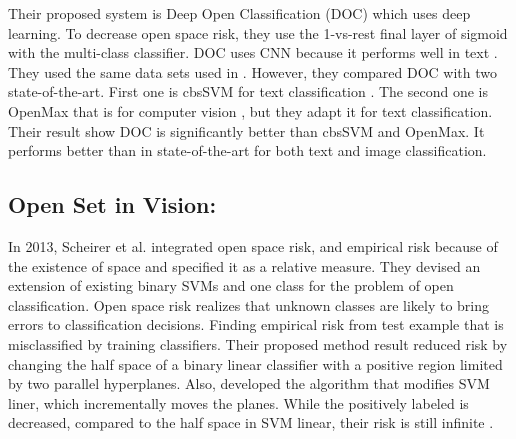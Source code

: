 \documentclass[conference]{IEEEtran}
\begin{document}
\par Their proposed system is Deep Open Classification (DOC) which uses deep learning. To decrease open space risk, they use the 1-vs-rest final layer of sigmoid with the multi-class classifier. DOC uses CNN because it performs well in text \cite{kim2014convolutional}. They used the same data sets used in \cite{fei2016breaking} \cite{rennie200820} \cite{chen2014mining}. However, they compared DOC with two state-of-the-art. First one is cbsSVM for text classification \cite{fei2016breaking}. The second one is OpenMax that is for computer vision \cite{bendale2016towards}, but they adapt it for text classification. Their result show DOC is significantly better than cbsSVM and OpenMax. It performs better than in state-of-the-art for both text and image classification\cite{shu2017doc}.





\subsection{ Open Set in Vision:}


\par In 2013, Scheirer et al. \cite{scheirer2013toward} integrated open space risk, and empirical risk because of the existence of space and specified it as a relative measure. They devised an extension of existing binary SVMs and one class for the problem of open classification. Open space risk realizes that unknown classes are likely to bring errors to classification decisions. Finding empirical risk from test example that is misclassified by training classifiers.
Their proposed method result reduced risk by changing the half space of a binary linear classifier with a positive region limited by two parallel hyperplanes. Also, developed the algorithm that modifies SVM liner, which incrementally moves the planes. While the positively labeled is decreased, compared to the half space in SVM linear, their risk is still infinite \cite{scheirer2013toward}. 
\end{document}
